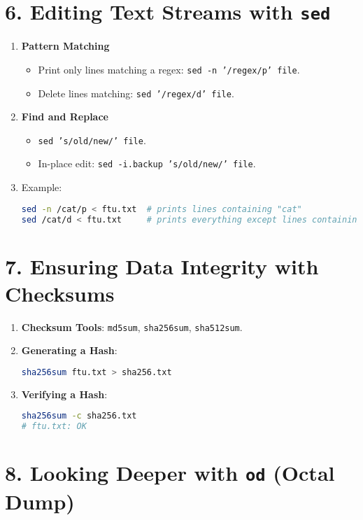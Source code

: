 \documentclass[a4paper]{report}
\begin{document}
\section*{6. Editing Text Streams with \texttt{sed}}
\begin{enumerate}
    \item \textbf{Pattern Matching}
    \begin{itemize}
        \item Print only lines matching a regex: \texttt{sed -n '/regex/p' file}.
        \item Delete lines matching: \texttt{sed '/regex/d' file}.
    \end{itemize}
    \item \textbf{Find and Replace}
    \begin{itemize}
        \item \texttt{sed 's/old/new/' file}.
        \item In-place edit: \texttt{sed -i.backup 's/old/new/' file}.
    \end{itemize}
    \item Example:
    \begin{lstlisting}[language=bash]
sed -n /cat/p < ftu.txt  # prints lines containing "cat"
sed /cat/d < ftu.txt     # prints everything except lines containing "cat"
    \end{lstlisting}
\end{enumerate}

\section*{7. Ensuring Data Integrity with Checksums}
\begin{enumerate}
    \item \textbf{Checksum Tools}: \texttt{md5sum}, \texttt{sha256sum}, \texttt{sha512sum}.
    \item \textbf{Generating a Hash}:
    \begin{lstlisting}[language=bash]
sha256sum ftu.txt > sha256.txt
    \end{lstlisting}
    \item \textbf{Verifying a Hash}:
    \begin{lstlisting}[language=bash]
sha256sum -c sha256.txt
# ftu.txt: OK
    \end{lstlisting}
\end{enumerate}

\section*{8. Looking Deeper with \texttt{od} (Octal Dump)}
\end{document}
